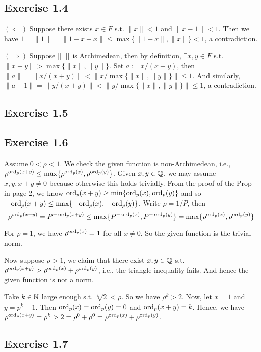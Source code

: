 \documentclass[../Koblitz.tex]{subfiles}
\begin{document}
\subsection*{Exercise 1.4}

$(\Leftarrow)$ Suppose there exists $x\in F$ s.t. $\|x\| < 1$ and $\|x-1\| < 1$. Then we have $1=\|1\|=\|1-x+x\|\leq \max\{\|1-x\|,\|x\|\} < 1$, a contradiction.

$(\Rightarrow)$ Suppose $\dnr$ is Archimedean, then by definition, $\exists x,y\in F$ s.t. $\|x+y\|>\max\{ \|x\|,\|y\|\}$. Set $a:=x/(x+y)$, then $\|a\|=\|x/(x+y)\| < \|x/\max\{ \|x\|,\|y\|\} \| \leq 1$. And similarly, $\|a-1\|=\|y/(x+y)\| < \|y/\max\{ \|x\|,\|y\|\} \| \leq 1$, a contradiction.

\subsection*{Exercise 1.5}

\subsection*{Exercise 1.6}

Assume $0<\rho<1$. We check the given function is non-Archimedean, i.e., $\rho^{\operatorname{ord}_p(x+y)}\leq \max\{\rho^{\operatorname{ord}_p(x)},\rho^{\operatorname{ord}_p(y)}\}$. Given $x,y\in\mathbb{Q}$, we may assume $x,y,x+y\neq0$ because otherwise this holds trivially. From the proof of the Prop in page 2, we know $\operatorname{ord}_p(x+y) \geq \min\{\operatorname{ord}_p(x),\operatorname{ord}_p(y)\}$ and so $-\operatorname{ord}_p(x+y) \leq \max\{-\operatorname{ord}_p(x),-\operatorname{ord}_p(y)\}$. Write $\rho=1/P$, then $$\rho^{\operatorname{ord}_p(x+y)} = P^{-\operatorname{ord}_p(x+y)} \leq \max\{P^{-\operatorname{ord}_p(x)},P^{-\operatorname{ord}_p(y)}\} = \max\{\rho^{\operatorname{ord}_p(x)},\rho^{\operatorname{ord}_p(y)}\}$$

For $\rho=1$, we have $\rho^{\operatorname{ord}_p(x)}=1$ for all $x\neq0$. So the given function is the trivial norm.

Now suppose $\rho>1$, we claim that there exist $x,y\in\mathbb{Q}$ s.t. $\rho^{\operatorname{ord}_p(x+y)} > \rho^{\operatorname{ord}_p(x)}+\rho^{\operatorname{ord}_p(y)}$, i.e., the triangle inequality fails. And hence the given function is not a norm.

Take $k\in\mathbb{N}$ large enough s.t. $\sqrt[k]{2}<\rho$. So we have $\rho^k>2$. Now, let $x=1$ and $y=p^k-1$. Then $\operatorname{ord}_p(x)=\operatorname{ord}_p(y)=0$ and $\operatorname{ord}_p(x+y)=k$. Hence, we have $\rho^{\operatorname{ord}_p(x+y)} = \rho^k >2 = \rho^0 + \rho^0 = \rho^{\operatorname{ord}_p(x)}+\rho^{\operatorname{ord}_p(y)}$.

\subsection*{Exercise 1.7}
\end{document}
